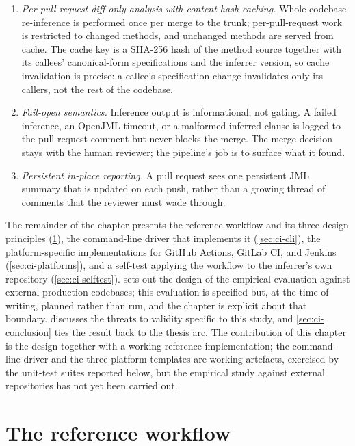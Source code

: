 \begin{enumerate}
    \item \emph{Per-pull-request diff-only analysis with content-hash caching.}
    Whole-codebase re-inference is performed once per merge to the trunk;
    per-pull-request work is restricted to changed methods, and unchanged methods
    are served from cache. The cache key is a SHA-256 hash of the method source
    together with its callees' canonical-form specifications and the inferrer
    version, so cache invalidation is precise: a callee's specification change
    invalidates only its callers, not the rest of the codebase.

    \item \emph{Fail-open semantics.} Inference output is informational, not
    gating. A failed inference, an OpenJML timeout, or a malformed inferred
    clause is logged to the pull-request comment but never blocks the merge. The
    merge decision stays with the human reviewer; the pipeline's job is to
    surface what it found.

    \item \emph{Persistent in-place reporting.} A pull request sees one
    persistent JML summary that is updated on each push, rather than a growing
    thread of comments that the reviewer must wade through.
\end{enumerate}

The remainder of the chapter presents the reference workflow and its three
design principles (\cref{sec:ci-workflow}), the command-line driver that
implements it (\cref{sec:ci-cli}), the platform-specific implementations for
GitHub Actions, GitLab CI, and Jenkins (\cref{sec:ci-platforms}), and a self-test
applying the workflow to the inferrer's own repository
(\cref{sec:ci-selftest}).  sets out the design of the
empirical evaluation against external production codebases; this evaluation is
specified but, at the time of writing, planned rather than run, and the chapter is
explicit about that boundary.  discusses the threats to
validity specific to this study, and \cref{sec:ci-conclusion} ties the result
back to the thesis arc. The contribution of this chapter is the design together
with a working reference implementation; the command-line driver and the three
platform templates are working artefacts, exercised by the unit-test suites
reported below, but the empirical study against external repositories has not yet
been carried out.

\section{The reference workflow}
\label{sec:ci-workflow}

